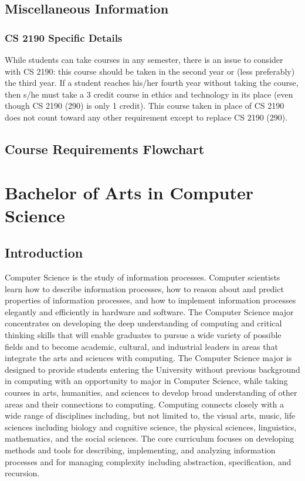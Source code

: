 \documentclass[10pt,letter]{book}
\newcommand{\mychapter}[2]{\chapter{#1}\renewcommand{\leftmark}{\textsc{#2}}}
\newcommand{\mysection}[1]{\section{#1}\renewcommand{\rightmark}{#1}}
\begin{document}
\mysection{Miscellaneous Information}
\subsection{CS 2190 Specific Details}

While students can take courses in any semester, there is an issue to
consider with CS 2190: this course should be taken in the second
year or (less preferably) the third year. If a student reaches his/her
fourth year without taking the course, then s/he must take a 3 credit
course in ethics and technology in its place (even though CS 2190
(290) is only 1 credit). This course taken in place of CS 2190
does not count toward any other requirement except to replace CS 2190
(290).



\clearpage
\mysection{Course Requirements Flowchart}

\begin{figure}[h!]
\end{figure}


\clearpage
\mychapter{Bachelor of Arts in Computer Science}{BA CS Degree}

\mysection{Introduction}

Computer Science is the study of information processes. Computer
scientists learn how to describe information processes, how to reason
about and predict properties of information processes, and how to
implement information processes elegantly and efficiently in hardware
and software. The Computer Science major concentrates on developing
the deep understanding of computing and critical thinking skills that
will enable graduates to pursue a wide variety of possible fields and
to become academic, cultural, and industrial leaders in areas that
integrate the arts and sciences with computing. The Computer Science
major is designed to provide students entering the University without
previous background in computing with an opportunity to major in
Computer Science, while taking courses in arts, humanities, and
sciences to develop broad understanding of other areas and their
connections to computing. Computing connects closely with a wide range
of disciplines including, but not limited to, the visual arts, music,
life sciences including biology and cognitive science, the physical
sciences, linguistics, mathematics, and the social sciences. The core
curriculum focuses on developing methods and tools for describing,
implementing, and analyzing information processes and for managing
complexity including abstraction, specification, and recursion. 
\end{document}
